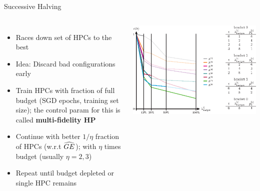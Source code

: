 \begin{vbframe}{Successive Halving}

\begin{columns}
\begin{itemize}
\item Races down set of HPCs to the best
\item Idea: Discard bad configurations early
\item Train HPCs with fraction of full budget (SGD epochs, training set size); the control param for this is called \textbf{multi-fidelity HP}
\item Continue with better $1/\eta$ fraction of HPCs (w.r.t $\widehat{GE}_{}$); 
with $\eta$ times budget (usually $\eta = 2,3$)
\item Repeat until budget depleted or single HPC remains
\end{itemize}
\begin{center}
\includegraphics[trim=0 0 100 0, clip, width = 1.0\textwidth]{figure/hyperband.eps}
\end{center}
\end{columns}
\end{vbframe}

